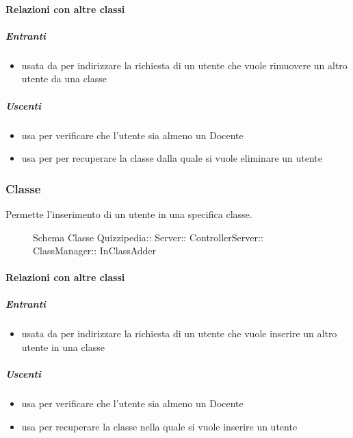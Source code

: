 \paragraph{Relazioni con altre classi}
\subparagraph{Entranti}
\begin{itemize}
\item usata da  per indirizzare la richiesta di un utente che vuole rimuovere un altro utente da una classe
\end{itemize}
\subparagraph{Uscenti}
\begin{itemize}
\item usa  per verificare che l'utente sia almeno un Docente
\item usa  per per recuperare la classe dalla quale si vuole eliminare un utente
\end{itemize}
\subsubsection{Classe }
Permette l'inserimento di un utente in una specifica classe.
\begin{figure}[H]
\centering
\noindent{}
\caption[Schema Classe InClassAdder]{Schema Classe Quizzipedia:: Server:: ControllerServer:: ClassManager:: InClassAdder}
\end{figure}
\paragraph{Relazioni con altre classi}
\subparagraph{Entranti}
\begin{itemize}
\item usata da  per indirizzare la richiesta di un utente che vuole inserire un altro utente in una classe
\end{itemize}
\subparagraph{Uscenti}
\begin{itemize}
\item usa  per verificare che l'utente sia almeno un Docente
\item usa  per recuperare la classe nella quale si vuole inserire un utente
\end{itemize}

